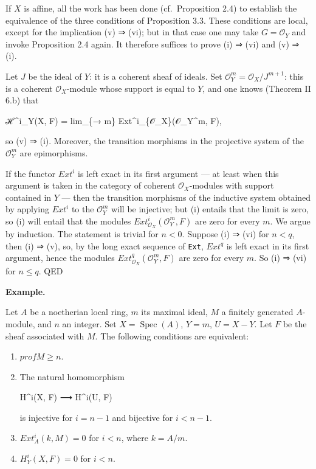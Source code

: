 \documentclass[
]{article}
\newenvironment{Shaded}{}{}
\newcommand{\NormalTok}[1]{#1}
\begin{document}
If \(X\) is affine, all the work has been done (cf.~Proposition 2.4) to
establish the equivalence of the three conditions of Proposition 3.3.
These conditions are local, except for the implication (v) ⇒ (vi); but
in that case one may take \(G = \mathcal{O}_{Y}\) and invoke Proposition
2.4 again. It therefore suffices to prove (i) ⇒ (vi) and (v) ⇒ (i).

Let \(J\) be the ideal of \(Y\): it is a coherent sheaf of ideals. Set
\(\mathcal{O}^{m}_{Y} = \mathcal{O}_{X}/J^{m+1}\): this is a coherent
\(\mathcal{O}_{X}\)-module whose support is equal to \(Y\), and one
knows (Theorem II 6.b) that

\begin{Shaded}
\begin{Highlighting}[]
\NormalTok{ℋ\^{}i\_Y(X, F) = lim\_\{→ m\} Ext\^{}i\_\{𝒪\_X\}(𝒪\_Y\^{}m, F),}
\end{Highlighting}
\end{Shaded}

so (v) ⇒ (i). Moreover, the transition morphisms in the projective
system of the \(\mathcal{O}^{m}_{Y}\) are epimorphisms.

If the functor \(Ext^{i}\) is left exact in its first argument --- at
least when this argument is taken in the category of coherent
\(\mathcal{O}_{X}\)-modules with support contained in \(Y\) --- then the
transition morphisms of the inductive system obtained by applying
\(Ext^{i}\) to the \(\mathcal{O}^{m}_{Y}\) will be injective; but (i)
entails that the limit is zero, so (i) will entail that the modules
\(Ext^{i}_{\mathcal{O}_{X}}(\mathcal{O}^{m}_{Y}, F)\) are zero for every
\(m\). We argue by induction. The statement is trivial for \(n < 0\).
Suppose (i) ⇒ (vi) for \(n < q\), then (i) ⇒ (v), so, by the long exact
sequence of \texttt{Ext}, \(Ext^{q}\) is left exact in its first
argument, hence the modules
\(Ext^{q}_{\mathcal{O}_{X}}(\mathcal{O}^{m}_{Y}, F)\) are zero for every
\(m\). So (i) ⇒ (vi) for \(n \leqslant q\). QED

\textbf{Example.}

Let \(A\) be a noetherian local ring, \(m\) its maximal ideal, \(M\) a
finitely generated \(A\)-module, and \(n\) an integer. Set
\(X = \operatorname{Spec}(A)\), \(Y = {m}\), \(U = X - Y\). Let \(F\) be
the sheaf associated with \(M\). The following conditions are
equivalent:

\begin{enumerate}
\def\labelenumi{\arabic{enumi}.}
\item
  \(prof M \geqslant n\).
\item
  The natural homomorphism

\begin{Shaded}
\begin{Highlighting}[]
\NormalTok{H\^{}i(X, F) ⟶ H\^{}i(U, F)}
\end{Highlighting}
\end{Shaded}

  is injective for \(i = n - 1\) and bijective for \(i < n - 1\).
\item
  \(Ext^{i}_{A}(k, M) = 0\) for \(i < n\), where \(k = A/m\).
\item
  \(H^{i}_{Y}(X, F) = 0\) for \(i < n\).
\end{enumerate}
\end{document}
